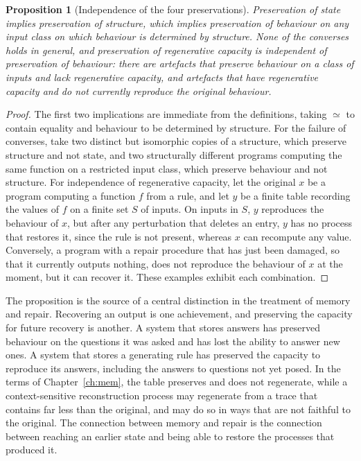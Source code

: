 \documentclass[11pt,twoside,openright]{book}
\theoremstyle{plain}
\newtheorem{proposition}[theorem]{Proposition}
\theoremstyle{definition}
\theoremstyle{remark}
\begin{document}
\begin{proposition}[Independence of the four preservations]\label{prop:four}
Preservation of state implies preservation of structure, which implies preservation of behaviour on any input class on which behaviour is determined by structure. None of the converses holds in general, and preservation of regenerative capacity is independent of preservation of behaviour: there are artefacts that preserve behaviour on a class of inputs and lack regenerative capacity, and artefacts that have regenerative capacity and do not currently reproduce the original behaviour.
\end{proposition}

\begin{proof}
The first two implications are immediate from the definitions, taking $\simeq$ to contain equality and behaviour to be determined by structure. For the failure of converses, take two distinct but isomorphic copies of a structure, which preserve structure and not state, and two structurally different programs computing the same function on a restricted input class, which preserve behaviour and not structure. For independence of regenerative capacity, let the original $x$ be a program computing a function $f$ from a rule, and let $y$ be a finite table recording the values of $f$ on a finite set $S$ of inputs. On inputs in $S$, $y$ reproduces the behaviour of $x$, but after any perturbation that deletes an entry, $y$ has no process that restores it, since the rule is not present, whereas $x$ can recompute any value. Conversely, a program with a repair procedure that has just been damaged, so that it currently outputs nothing, does not reproduce the behaviour of $x$ at the moment, but it can recover it. These examples exhibit each combination.
\end{proof}

The proposition is the source of a central distinction in the treatment of memory and repair. Recovering an output is one achievement, and preserving the capacity for future recovery is another. A system that stores answers has preserved behaviour on the questions it was asked and has lost the ability to answer new ones. A system that stores a generating rule has preserved the capacity to reproduce its answers, including the answers to questions not yet posed. In the terms of Chapter~\ref{ch:mem}, the table preserves and does not regenerate, while a context-sensitive reconstruction process may regenerate from a trace that contains far less than the original, and may do so in ways that are not faithful to the original. The connection between memory and repair is the connection between reaching an earlier state and being able to restore the processes that produced it.
\end{document}
